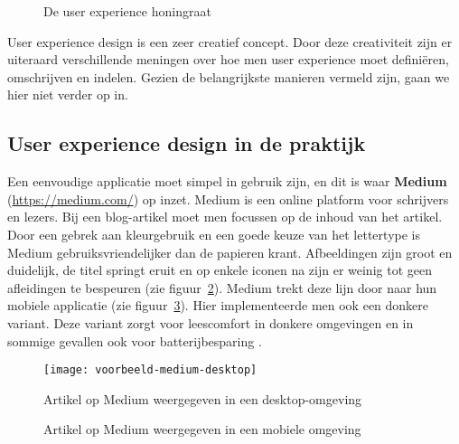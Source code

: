 \begin{figure}
    \centering
    \def\svgwidth{.8\columnwidth}
    
    \caption{De user experience honingraat}
    \label{fig:ux-facets}
\end{figure}

User experience design is een zeer creatief concept. Door deze creativiteit zijn er uiteraard verschillende meningen over hoe men user experience moet definiëren, omschrijven en indelen. Gezien de belangrijkste manieren vermeld zijn, gaan we hier niet verder op in.

\subsection{User experience design in de praktijk}
\label{sec:user-experience-in-software:user-experience-design-in-de-praktijk}

Een eenvoudige applicatie moet simpel in gebruik zijn, en dit is waar \textbf{Medium} (\href{https://medium.com/@jtnakagawa/nothing-left-to-take-away-437eb23c2ae8}{https://medium.com/}) op inzet. Medium is een online platform voor schrijvers en lezers. Bij een blog-artikel moet men focussen op de inhoud van het artikel. Door een gebrek aan kleurgebruik en een goede keuze van het lettertype is Medium gebruiksvriendelijker dan de papieren krant. Afbeeldingen zijn groot en duidelijk, de titel springt eruit en op enkele iconen na zijn er weinig tot geen afleidingen te bespeuren (zie figuur~\ref{fig:ux-voorbeeld-medium:desktop}). Medium trekt deze lijn door naar hun mobiele applicatie (zie figuur~\ref{fig:ux-voorbeeld-medium:mobiel}). Hier implementeerde men ook een donkere variant. Deze variant zorgt voor leescomfort in donkere omgevingen en in sommige gevallen ook voor batterijbesparing \autocite{Jin2017}.

\begin{figure}
    \centering
    \texttt{[image: voorbeeld-medium-desktop]}
    \caption{Artikel op Medium weergegeven in een desktop-omgeving}
    \label{fig:ux-voorbeeld-medium:desktop}
\end{figure}

\begin{figure}
    \centering
    \qquad
    \caption{Artikel op Medium weergegeven in een mobiele omgeving}
    \label{fig:ux-voorbeeld-medium:mobiel}
\end{figure}

